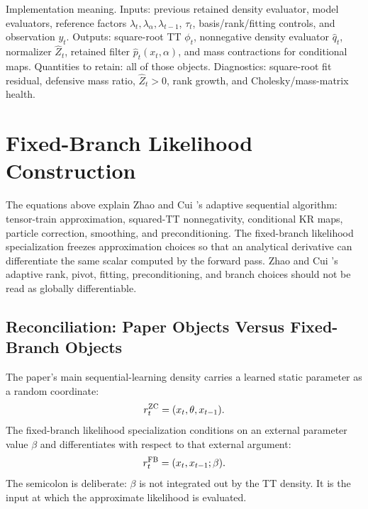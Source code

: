 \documentclass[11pt]{article}
\numberwithin{equation}{section}
\begin{document}
Implementation meaning. Inputs: previous retained density evaluator,
model evaluators, reference factors \(\lambda_t,\lambda_\alpha,\lambda_{t-1}\),
\(\tau_t\), basis/rank/fitting controls, and observation \(y_t\).  Outputs:
square-root TT \(\phi_t\), nonnegative density evaluator \(\widehat q_t\),
normalizer \(\widehat Z_t\), retained filter \(\widehat p_t(x_t,\alpha)\), and
mass contractions for conditional maps.  Quantities to retain: all of those objects.
Diagnostics: square-root fit residual, defensive mass ratio, \(\widehat Z_t>0\),
rank growth, and Cholesky/mass-matrix health.

\section{Fixed-Branch Likelihood Construction}

The equations above explain Zhao and Cui \cite{zhao2024ttsequential}'s adaptive
sequential algorithm: tensor-train approximation, squared-TT nonnegativity,
conditional KR maps, particle correction, smoothing, and preconditioning.  The
fixed-branch likelihood specialization freezes approximation choices so that
an analytical derivative can differentiate the same scalar computed by the
forward pass.  Zhao and Cui \cite{zhao2024ttsequential}'s adaptive rank, pivot,
fitting, preconditioning, and branch choices should not be read as globally
differentiable.

\subsection*{Reconciliation: Paper Objects Versus Fixed-Branch Objects}

The paper's main sequential-learning density carries a learned static
parameter as a random coordinate:
\begin{equation}
    r_t^{\rm ZC}=(x_t,\theta,x_{t-1}).
    \label{eq:p24-r1}
\end{equation}
The fixed-branch likelihood specialization conditions on an external parameter value
\(\beta\) and differentiates with respect to that external argument:
\begin{equation}
    r_t^{\rm FB}=(x_t,x_{t-1};\beta).
    \label{eq:p24-r2}
\end{equation}
The semicolon is deliberate: \(\beta\) is not integrated out by the TT density.
It is the input at which the approximate likelihood is evaluated.
\end{document}
